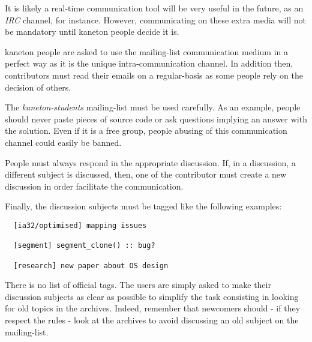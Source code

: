 It is likely a real-time communication tool will be very useful in the
future, as an \textit{IRC} channel, for instance. However, communicating on
these extra media will not be mandatory until kaneton people decide it is.

kaneton people are asked to use the mailing-list communication medium
in a perfect way as it is the unique intra-communication channel. In
addition then, contributors must read their emails on a regular-basis
as some people rely on the decision of others.

The \textit{kaneton-students} mailing-list must be used carefully. As
an example, people should never paste pieces of source code or ask
questions implying an answer with the solution. Even if it is a free
group, people abusing of this communication channel could easily be banned.

People must always respond in the appropriate discussion. If, in a discussion,
a different subject is discussed, then, one of the contributor must create
a new discussion in order facilitate the communication.

Finally, the discussion subjects must be tagged like the following examples:

\begin{verbatim}
  [ia32/optimised] mapping issues

  [segment] segment_clone() :: bug?

  [research] new paper about OS design
\end{verbatim}

There is no list of official tags. The users are simply asked to make
their discussion subjects as clear as possible to simplify the task
consisting in looking for old topics in the archives. Indeed, remember
that newcomers should - if they respect the rules - look at the archives
to avoid discussing an old subject on the mailing-list.
